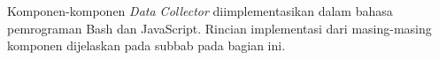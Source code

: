 Komponen-komponen \textit{Data Collector} diimplementasikan dalam bahasa pemrograman Bash dan JavaScript. Rincian implementasi dari masing-masing komponen dijelaskan pada subbab pada bagian ini.



